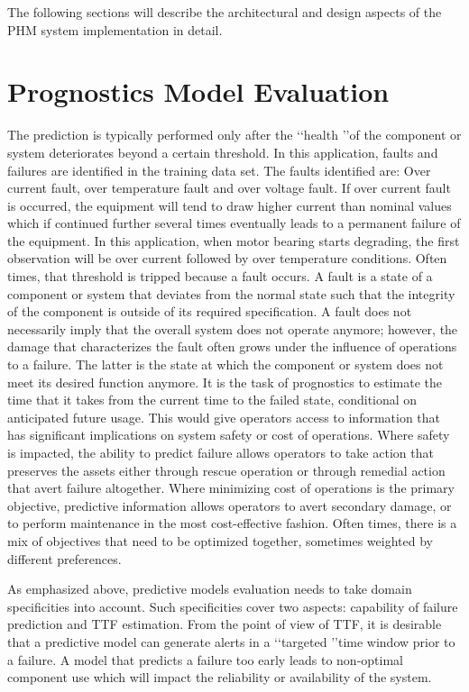 \documentclass[sigconf]{acmart}
\begin{document}
The following sections will describe the architectural and design aspects of the PHM system implementation in detail.

\section{Prognostics Model Evaluation}
\cite{Saxena2009} The prediction is typically performed only after the \lq\lq health \rq\rq of the component or system deteriorates beyond a certain threshold. In this application, faults and failures are identified in the training data set. The faults identified are: Over current fault, over temperature fault and over voltage fault. If over current fault is occurred, the equipment will tend to draw higher current than nominal values which if continued further several times eventually leads to a permanent failure of the equipment. In this application, when motor bearing starts degrading, the first observation will be over current followed by over temperature conditions.
Often times, that threshold is tripped because a fault occurs. A fault is a state of a component or system that deviates from the normal state such that the integrity of the component is outside of its required specification. A fault does not necessarily imply that the overall system does not operate anymore; however, the damage that characterizes the fault often grows under the influence of operations to a failure. The latter is the state at which the component or system does not meet its desired function anymore. It is the task of prognostics to estimate the time that it takes from the current time to the failed state, conditional on anticipated future usage. This would give operators access to information that has significant implications on system safety or cost of operations. Where safety is impacted, the ability to predict failure allows operators to take action that preserves the assets either through rescue operation or through remedial action that avert failure altogether. Where minimizing cost of operations is the primary objective, predictive information allows operators to avert secondary damage, or to perform maintenance in the most cost-effective fashion. Often times, there is a mix of objectives that need to be optimized together, sometimes weighted by different preferences.

As emphasized above, predictive models evaluation needs to take domain specificities into account. Such specificities cover two aspects: capability of failure prediction and TTF estimation. From the point of view of TTF, it is desirable that a predictive model can generate alerts in a \lq\lq targeted \rq\rq time window prior to a failure. A model that predicts a failure too early leads to non-optimal component use \cite{Yang2014} which will impact the reliability or availability of the system.
\end{document}
